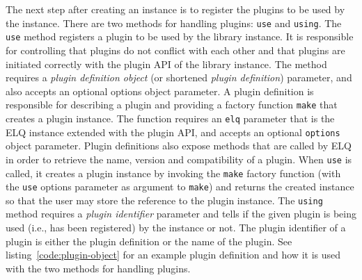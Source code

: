 \documentclass[a4paper,11pt]{kth-mag}
\newcommand{\code}[1]{\texttt{#1}}
\begin{document}
        The next step after creating an instance is to register the plugins to be used by the instance.
        There are two methods for handling plugins: \code{use} and \code{using}.
        The \code{use} method registers a plugin to be used by the library instance.
        It is responsible for controlling that plugins do not conflict with each other and that plugins are initiated correctly with the plugin \gls{API} of the library instance.
        The method requires a \emph{plugin definition object} (or shortened \emph{plugin definition}) parameter, and also accepts an optional options object parameter.
        A plugin definition is responsible for describing a plugin and providing a factory function \code{make} that creates a plugin instance.
        The function requires an \code{elq} parameter that is the \gls{ELQ} instance extended with the plugin \gls{API}, and accepts an optional \code{options} object parameter.
        Plugin definitions also expose methods that are called by \gls{ELQ} in order to retrieve the name, version and compatibility of a plugin.
        When \code{use} is called, it creates a plugin instance by invoking the \code{make} factory function (with the \code{use} options parameter as argument to \code{make}) and returns the created instance so that the user may store the reference to the plugin instance.
        The \code{using} method requires a \emph{plugin identifier} parameter and tells if the given plugin is being used (i.e., has been registered) by the instance or not.
        The plugin identifier of a plugin is either the plugin definition or the name of the plugin.
        See listing~\ref{code:plugin-object} for an example plugin definition and how it is used with the two methods for handling plugins.
\end{document}

